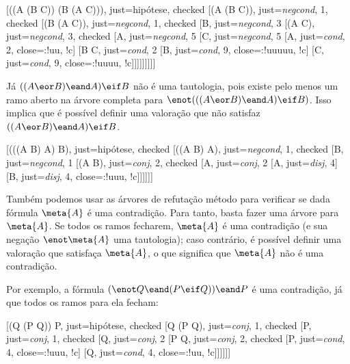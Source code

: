 \begin{center}
\begin{tableau}
	{
	}
	[\enot((A \eif (B \eif C)) \eif (B \eif (A \eif C))), just={hipótese}, checked
	[(A \eif (B \eif C)), just={\emph{negcond}, 1}, checked
	[\enot (B \eif (A \eif C)), just={\emph{negcond}, 1}, checked
	[B, just={\emph{negcond}, 3}
	[\enot(A \eif C), just={\emph{negcond}, 3}, checked
	[A, just={\emph{negcond}, 5}
	[\enot C, just={\emph{negcond}, 5}
		[\enot A, just={\emph{cond}, 2}, close={:!uu, !c}]
		[B \eif C, just={\emph{cond}, 2}
			[\enot B,  just={\emph{cond}, 9}, close={:!uuuuu, !c}]
			[C, just={\emph{cond}, 9}, close={:!uuuu, !c}]]]]]]]]]
\end{tableau}
\end{center}

Já $((A \eor B) \eand A) \eif B$ não é uma tautologia, pois existe pelo menos um ramo aberto na árvore completa para $\enot(((A \eor B) \eand A) \eif B)$.
Isso implica que é possível definir uma valoração que não satisfaz $((A \eor B) \eand A) \eif B$.

\begin{center}
	\begin{tableau}
		{
		}
		[\enot(((A \eor B) \eand A) \eif B), just={hipótese}, checked
		[((A \eor B) \eand A), just={\emph{negcond}, 1}, checked
		[\enot B, just={\emph{negcond}, 1}
		[(A \eor B), just={\emph{conj}, 2}, checked
		[A, just={\emph{conj}, 2}
			[A, just={\emph{disj}, 4}]
			[B, just={\emph{disj}, 4}, close={:!uuu, !c}]]]]]]
	\end{tableau}
\end{center}

Também podemos usar as árvores de refutação método para verificar se dada fórmula $\meta{A}$ é uma contradição. 
Para tanto, basta fazer uma árvore para $\meta{A}$.
Se todos os ramos fecharem, $\meta{A}$ é uma contradição (e sua negação $\enot \meta{A}$ uma tautologia); caso contrário, é possível definir uma valoração que satisfaça $\meta{A}$, o que significa que $\meta{A}$ não é uma contradição.

Por exemplo, a fórmula $(\enot Q \eand (P \eif Q)) \eand P$ é uma contradição, já que todos os ramos para ela fecham:

\begin{center}
\begin{tableau}
	{
	}
	[(\enot Q \eand (P \eif Q)) \eand P, just={hipótese}, checked
	[\enot Q \eand (P \eif Q), just={\emph{conj}, 1}, checked
	[P, just={\emph{conj}, 1}, checked
	[\enot Q, just={\emph{conj}, 2}
	[P \eif Q, just={\emph{conj}, 2}, checked
		[\enot P, just={\emph{cond}, 4}, close={:!uuu, !c}]
		[Q, just={\emph{cond}, 4}, close={:!uu, !c}]]]]]]
\end{tableau}
\end{center}

